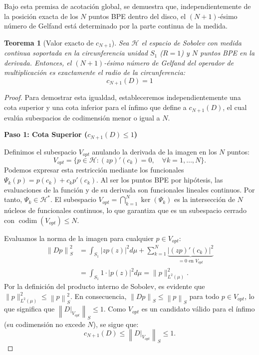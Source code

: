 \documentclass[12pt,a4paper]{article}
\newtheorem{teorema}{Teorema}
\theoremstyle{definition}
\theoremstyle{remark}
\newcommand{\norm}[1]{\left\| #1 \right\|_S}
\newcommand{\abs}[1]{\left| #1 \right|}
\begin{document}
Bajo esta premisa de acotación global, se demuestra que, independientemente de la posición exacta de los $N$ puntos BPE dentro del disco, el $(N+1)$-ésimo número de Gelfand está determinado por la parte continua de la medida.

\begin{teorema}[Valor exacto de $c_{N+1}$]
    Sea $\mathcal{H}$ el espacio de Sobolev con medida continua soportada en la circunferencia unidad $S_1$ ($R=1$) y $N$ puntos BPE en la derivada. Entonces, el $(N+1)$-ésimo número de Gelfand del operador de multiplicación es exactamente el radio de la circunferencia:
    $$ c_{N+1}(D) = 1 $$
\end{teorema}

\begin{proof}
    Para demostrar esta igualdad, estableceremos independientemente una cota superior y una cota inferior para el ínfimo que define a $c_{N+1}(D)$, el cual evalúa subespacios de codimensión menor o igual a $N$.

    \textbf{Paso 1: Cota Superior ($c_{N+1}(D) \le 1$)}

    Definimos el subespacio $V_{opt}$ anulando la derivada de la imagen en los $N$ puntos:
    $$ V_{opt} = \{ p \in \mathcal{H} : (zp)'(c_k) = 0, \quad \forall k=1,\dots,N \}. $$
    Podemos expresar esta restricción mediante los funcionales $\Psi_k(p) = p(c_k) + c_k p'(c_k)$. Al ser los puntos BPE por hipótesis, las evaluaciones de la función y de su derivada son funcionales lineales continuos. Por tanto, $\Psi_k \in \mathcal{H}^*$.
    El subespacio $V_{opt} = \bigcap_{k=1}^N \ker(\Psi_k)$ es la intersección de $N$ núcleos de funcionales continuos, lo que garantiza que es un subespacio cerrado con $\operatorname{codim}(V_{opt}) \le N$.

    Evaluamos la norma de la imagen para cualquier $p \in V_{opt}$:
    \begin{align*}
        \norm{Dp}^2 & = \int_{S_1} \abs{z p(z)}^2 d\mu + \sum_{k=1}^N \underbrace{\abs{(zp)'(c_k)}^2}_{=0 \text{ en } V_{opt}} \\
                    & = \int_{S_1} 1 \cdot \abs{p(z)}^2 d\mu = \|p\|_{L^2(\mu)}^2.
    \end{align*}
    Por la definición del producto interno de Sobolev, es evidente que $\|p\|_{L^2(\mu)}^2 \le \norm{p}^2$. En consecuencia, $\norm{Dp} \le \norm{p}$ para todo $p \in V_{opt}$, lo que significa que $\norm{D|_{V_{opt}}} \le 1$.
    Como $V_{opt}$ es un candidato válido para el ínfimo (su codimensión no excede $N$), se sigue que:
    $$ c_{N+1}(D) \le \norm{D|_{V_{opt}}} \le 1. $$


\end{proof}
\end{document}

